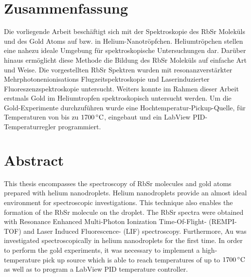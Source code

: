 \documentclass[parskip,12pt,headsepline,a4paper] {scrbook}
\begin{document}
\section*{Zusammenfassung}
\vspace{-0.5\baselineskip}
Die vorliegende Arbeit besch\"aftigt sich mit der Spektroskopie des RbSr Molek\"uls und des Gold Atoms auf bzw. in Helium-Nanotr\"opfchen. Heliumtr\"opchen stellen eine nahezu ideale Umgebung f\"ur spektroskopische Untersuchungen dar. Dar\"uber hinaus erm\"oglicht diese Methode die Bildung des RbSr Molek\"uls auf einfache Art und Weise. Die vorgestellten RbSr Spektren wurden mit resonanzverst\"arkter Mehrphotonenionisations Flugzeitspektroskopie und Laserinduzierter Fluoreszenzspektroskopie untersucht. Weiters konnte im Rahmen dieser Arbeit erstmals Gold im Heliumtropfen spektroskopisch untersucht werden. Um die Gold-Experimente durchzuf\"uhren wurde eine Hochtemperatur-Pickup-Quelle, f\"ur Temperaturen von bis zu $\unit[1700]{^\circ C}$, eingebaut und ein LabView PID- Temperaturregler programmiert.


\section*{Abstract}
\vspace{-0.5\baselineskip}
This thesis encompasses the spectroscopy of RbSr molecules and gold atoms prepared with helium nanodroplets. Helium nanodroplets provide an almost ideal environment for spectroscopic investigations. This technique also enables the formation of the RbSr molecule on the droplet. The RbSr spectra were obtained with Resonance Enhanced Multi-Photon Ionization Time-Of-Flight- (REMPI-TOF) and Laser Induced Fluorescence- (LIF) spectroscopy. Furthermore, Au was investigated spectroscopically in helium nanodroplets for the first time. In order to perform the gold experiments, it was necessary to implement a high-temperature pick up source which is able to reach temperatures of up to $\unit[1700]{^\circ C}$ as well as to program a LabView PID temperature controller.

\newpage



\tableofcontents

\mainmatter
\end{document}
